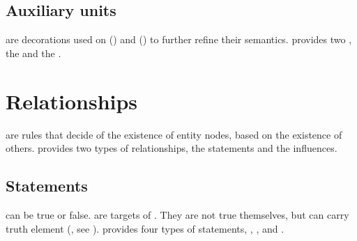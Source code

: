 \subsection{Auxiliary units}\label{sec:aux}

 are decorations used on  () and  () to further refine their semantics.  \SBGNERLone{} provides two , the  and the .





\section{Relationships}\label{sec:relationships}

 are rules that decide of the existence of entity nodes, based on the existence of others. 
\SBGNERLone{} provides two types of relationships, the statements and the influences.


\subsection{Statements}\label{sec:statements}

 can be true or false.  are targets of . They are not true themselves, but can carry truth element (, see ). \SBGNERLone{} provides four types of statements, , ,  and .

